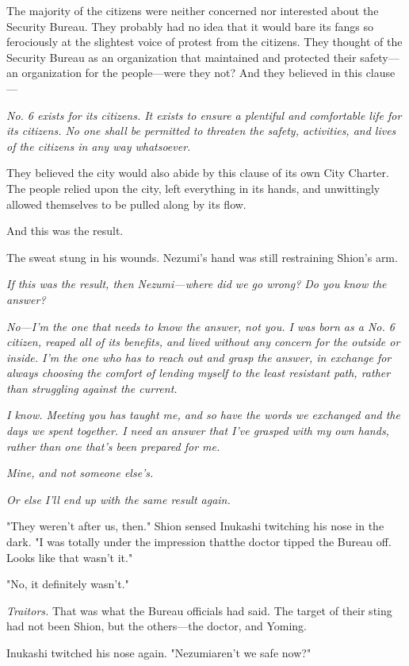 The majority of the citizens were neither concerned nor interested about
the Security Bureau. They probably had no idea that it would bare its
fangs so ferociously at the slightest voice of protest from the
citizens. They thought of the Security Bureau as an organization that
maintained and protected their safety---an organization for the
people---were they not? And they believed in this clause---

\emph{No. 6 exists for its citizens. It exists to ensure a plentiful and
comfortable life for its citizens. No one shall be permitted to threaten
the safety, activities, and lives of the citizens in any way whatsoever.}

They believed the city would also abide by this clause of its own City
Charter. The people relied upon the city, left everything in its hands,
and unwittingly allowed themselves to be pulled along by its flow.

And this was the result.

The sweat stung in his wounds. Nezumi's hand was still restraining
Shion's arm.

\emph{If this was the result, then Nezumi---where did we go wrong? Do you know
the answer?}

\emph{No---I'm the one that needs to know the answer, not you. I was born as a
No. 6 citizen, reaped all of its benefits, and lived without any concern
for the outside or inside. I'm the one who has to reach out and grasp
the answer, in exchange for always choosing the comfort of lending
myself to the least resistant path, rather than struggling against the
current.}

\emph{I know. Meeting you has taught me, and so have the words we exchanged
and the days we spent together. I need an answer that I've grasped with
my own hands, rather than one that's been prepared for me.}

\emph{Mine, and not someone else's.}

\emph{Or else I'll end up with the same result again.}

"They weren't after us, then." Shion sensed Inukashi twitching his nose
in the dark. "I was totally under the impression that\el the doctor
tipped the Bureau off. Looks like that wasn't it."

"No, it definitely wasn't."

\emph{Traitors.} That was what the Bureau officials had said. The target of
their sting had not been Shion, but the others---the doctor, and Yoming.

Inukashi twitched his nose again. "Nezumi\el aren't we safe now?"


